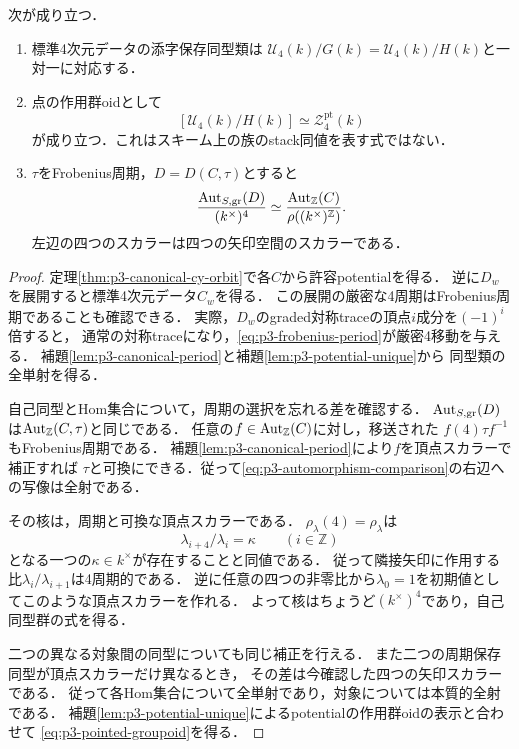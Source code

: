 \begin{theorem}[体上のpotential軌道による比較]
\label{thm:p3-potential-moduli}
次が成り立つ．
\begin{enumerate}[label=\textup{(\roman*)}]
\item 標準4次元データの添字保存同型類は
$\mathcal U_4(k)/G(k)=\mathcal U_4(k)/H(k)$と一対一に対応する．
\item 点の作用群oidとして
\begin{equation}\label{eq:p3-pointed-groupoid}
 [\mathcal U_4(k)/H(k)]\simeq\mathcal Z_4^{\mathrm{pt}}(k)
\end{equation}
が成り立つ．これはスキーム上の族のstack同値を表す式ではない．
\item $\tau$をFrobenius周期，$D=D(C,\tau)$とすると
\begin{equation}\label{eq:p3-automorphism-comparison}
 \frac{\operatorname{Aut}_{S,\mathrm{gr}}(D)}{(k^\times)^4}
 \simeq
 \frac{\operatorname{Aut}_{\mathbb Z}(C)}{\rho((k^\times)^{\mathbb Z})}.
\end{equation}
左辺の四つのスカラーは四つの矢印空間のスカラーである．
\end{enumerate}
\end{theorem}
\begin{proof}
定理\ref{thm:p3-canonical-cy-orbit}で各$C$から許容potentialを得る．
逆に$D_w$を展開すると標準4次元データ$C_w$を得る．
この展開の厳密な4周期はFrobenius周期であることも確認できる．
実際，$D_w$のgraded対称traceの頂点$i$成分を$(-1)^i$倍すると，
通常の対称traceになり，\eqref{eq:p3-frobenius-period}が厳密4移動を与える．
補題\ref{lem:p3-canonical-period}と補題\ref{lem:p3-potential-unique}から
同型類の全単射を得る．

自己同型とHom集合について，周期の選択を忘れる差を確認する．
$\operatorname{Aut}_{S,\mathrm{gr}}(D)$は$\operatorname{Aut}_{\mathbb Z}(C,\tau)$と同じである．
任意の$f\in\operatorname{Aut}_{\mathbb Z}(C)$に対し，移送された
$f(4)\tau f^{-1}$もFrobenius周期である．
補題\ref{lem:p3-canonical-period}により$f$を頂点スカラーで補正すれば
$\tau$と可換にできる．従って\eqref{eq:p3-automorphism-comparison}の右辺への写像は全射である．

その核は，周期と可換な頂点スカラーである．
$\rho_\lambda(4)=\rho_\lambda$は
\[
 \lambda_{i+4}/\lambda_i=\kappa\qquad(i\in\mathbb Z)
\]
となる一つの$\kappa\in k^\times$が存在することと同値である．
従って隣接矢印に作用する比$\lambda_i/\lambda_{i+1}$は4周期的である．
逆に任意の四つの非零比から$\lambda_0=1$を初期値としてこのような頂点スカラーを作れる．
よって核はちょうど$(k^\times)^4$であり，自己同型群の式を得る．

二つの異なる対象間の同型についても同じ補正を行える．
また二つの周期保存同型が頂点スカラーだけ異なるとき，
その差は今確認した四つの矢印スカラーである．
従って各Hom集合について全単射であり，対象については本質的全射である．
補題\ref{lem:p3-potential-unique}によるpotentialの作用群oidの表示と合わせて
\eqref{eq:p3-pointed-groupoid}を得る．
\end{proof}

